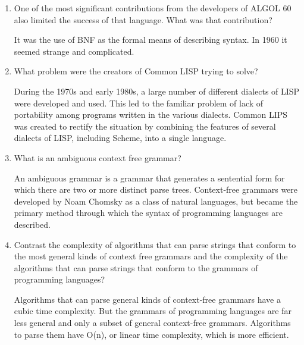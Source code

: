 \begin{enumerate}
\begin{answer}
    \end{answer}


  \item One of the most significant contributions from the developers
    of ALGOL 60 also limited the success of that language. What was
    that contribution?

  \begin{answer}

    It was the use of BNF as the formal means of describing syntax. In
    1960 it seemed strange and complicated.

    \end{answer}

  \item What problem were the creators of Common LISP trying to solve?

  \begin{answer}

    During the 1970s and early 1980s, a large number of different
    dialects of LISP were developed and used. This led to the familiar
    problem of lack of portability among programs written in the
    various dialects. Common LIPS was created to rectify the situation
    by combining the features of several dialects of LISP, including
    Scheme, into a single language.

    \end{answer}

  \item What is an ambiguous context free grammar?

  \begin{answer}

    An ambiguous grammar is a grammar that generates a sentential form
    for which there are two or more distinct parse trees. Context-free
    grammars were developed by Noam Chomsky as a class of natural
    languages, but became the primary method through which the syntax
    of programming languages are described.

    \end{answer}

  \item Contrast the complexity of algorithms that can parse strings
    that conform to the most general kinds of context free grammars
    and the complexity of the algorithms that can parse strings that
    conform to the grammars of programming languages?

  \begin{answer}

Algorithms that can parse general kinds of context-free grammars have
a cubic time complexity. But the grammars of programming languages are
far less general and only a subset of general context-free
grammars. Algorithms to parse them have O(n), or linear time
complexity, which is more efficient.


\end{answer}
\end{enumerate}

